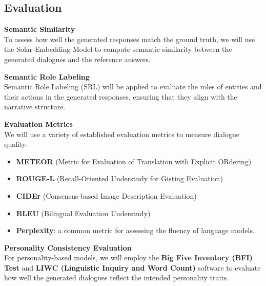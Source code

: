 \documentclass{article}
\begin{document}
\subsection{Evaluation}

\textbf{Semantic Similarity} \\
To assess how well the generated responses match the ground truth, we will use the Solar Embedding Model to compute semantic similarity between the generated dialogues and the reference answers.

\textbf{Semantic Role Labeling} \\
Semantic Role Labeling (SRL) will be applied to evaluate the roles of entities and their actions in the generated responses, ensuring that they align with the narrative structure.

\textbf{Evaluation Metrics} \\
We will use a variety of established evaluation metrics to measure dialogue quality:
\begin{itemize}
    \item \textbf{METEOR} (Metric for Evaluation of Translation with Explicit ORdering)
    \item \textbf{ROUGE-L} (Recall-Oriented Understudy for Gisting Evaluation)
    \item \textbf{CIDEr} (Consensus-based Image Description Evaluation)
    \item \textbf{BLEU} (Bilingual Evaluation Understudy)
    \item \textbf{Perplexity}: a common metric for assessing the fluency of language models.
\end{itemize}

\textbf{Personality Consistency Evaluation} \\
For personality-based models, we will employ the \textbf{Big Five Inventory (BFI) Test} and \textbf{LIWC (Linguistic Inquiry and Word Count)} software to evaluate how well the generated dialogues reflect the intended personality traits.






\clearpage
\end{document}
